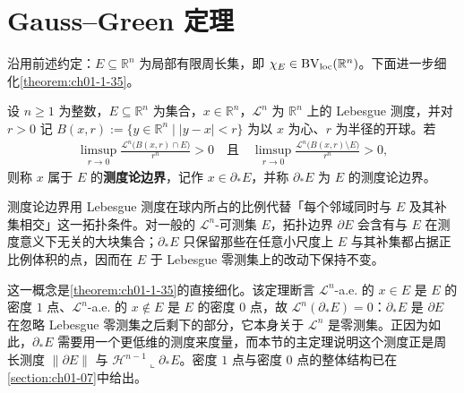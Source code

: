 \documentclass[../../main.tex]{subfiles}%
\begin{document}
\section{Gauss--Green 定理}\label{section:ch05-08}

沿用前述约定：$E\subseteq\mathbb{R}^n$ 为局部有限周长集，即 $\chi_E\in\mathrm{BV}_{\mathrm{loc}}(\mathbb{R}^n)$。下面进一步细化\cref{theorem:ch01-1-35}。%

\begin{definition}[测度论边界]\label{definition:ch05-5-7}
设 $n\geqslant1$ 为整数，$E\subseteq\mathbb{R}^n$ 为集合，$x\in\mathbb{R}^n$，$\mathcal{L}^n$ 为 $\mathbb{R}^n$ 上的 Lebesgue 测度，并对 $r>0$ 记 $B(x,r):=\{y\in\mathbb{R}^n\mid\lvert y-x\rvert<r\}$ 为以 $x$ 为心、$r$ 为半径的开球。若
\begin{align*}
\limsup_{r\to0}\frac{\mathcal{L}^n\bigl(B(x,r)\cap E\bigr)}{r^n}>0
\quad\text{且}\quad
\limsup_{r\to0}\frac{\mathcal{L}^n\bigl(B(x,r)\setminus E\bigr)}{r^n}>0,
\end{align*}
则称 $x$ 属于 $E$ 的\textbf{测度论边界}，记作 $x\in\partial_*E$，并称 $\partial_*E$ 为 $E$ 的测度论边界。
\end{definition}

\begin{remark}\label{remark:ch05-def-5-7-动机}
测度论边界用 Lebesgue 测度在球内所占的比例代替「每个邻域同时与 $E$ 及其补集相交」这一拓扑条件。对一般的 $\mathcal{L}^n$-可测集 $E$，拓扑边界 $\partial E$ 会含有与 $E$ 在测度意义下无关的大块集合；$\partial_*E$ 只保留那些在任意小尺度上 $E$ 与其补集都占据正比例体积的点，因而在 $E$ 于 Lebesgue 零测集上的改动下保持不变。

这一概念是\cref{theorem:ch01-1-35}的直接细化。该定理断言 $\mathcal{L}^n$-a.e. 的 $x\in E$ 是 $E$ 的密度 $1$ 点、$\mathcal{L}^n$-a.e. 的 $x\notin E$ 是 $E$ 的密度 $0$ 点，故 $\mathcal{L}^n(\partial_*E)=0$：$\partial_*E$ 是 $\partial E$ 在忽略 Lebesgue 零测集之后剩下的部分，它本身关于 $\mathcal{L}^n$ 是零测集。正因为如此，$\partial_*E$ 需要用一个更低维的测度来度量，而本节的主定理说明这个测度正是周长测度 $\lVert\partial E\rVert$ 与 $\mathcal{H}^{n-1}\llcorner\partial_*E$。密度 $1$ 点与密度 $0$ 点的整体结构已在\cref{section:ch01-07}中给出。%
\end{remark}
\end{document}
